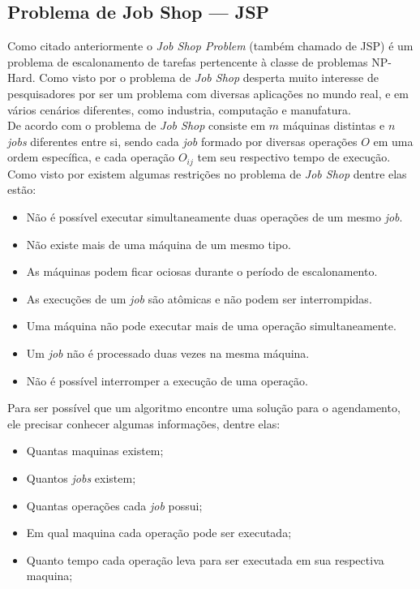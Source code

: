 \subsection{Problema de Job Shop — JSP}
Como citado anteriormente o \textit{Job Shop Problem} (também chamado de JSP) é um problema de escalonamento de tarefas pertencente à classe de problemas NP-Hard. Como visto por \cite{Cheng1996} o problema de \textit{Job Shop} desperta muito interesse de pesquisadores por ser um problema com diversas aplicações no mundo real, e em vários cenários diferentes, como industria, computação e manufatura.\\
\indent De acordo com \cite{Cheng1996} o problema de \textit{Job Shop} consiste em $m$ máquinas distintas e $n$ \textit{jobs} diferentes entre si, sendo cada \textit{job} formado por diversas operações $O$ em uma ordem específica, e cada operação $O_{ij}$ tem seu respectivo tempo de execução.\\
\noindent Como visto por \cite{Bagchi1999} existem algumas restrições no problema de \textit{Job Shop} dentre elas estão:
\begin{itemize}
    \item Não é possível executar simultaneamente duas operações de um mesmo \textit{job}.
    \item Não existe mais de uma máquina de um mesmo tipo.
    \item As máquinas podem ficar ociosas durante o período de escalonamento.
    \item As execuções de um \textit{job} são atômicas e não podem ser interrompidas.
    \item Uma máquina não pode executar mais de uma operação simultaneamente.
    \item Um \textit{job} não é processado duas vezes na mesma máquina.
    \item Não é possível interromper a execução de uma operação.
\end{itemize}

\noindent Para ser possível que um algoritmo encontre uma solução para o agendamento, ele precisar conhecer algumas informações, dentre elas: 
\begin{itemize}
    \item Quantas maquinas existem;
    \item Quantos \textit{jobs} existem;
    \item Quantas operações cada \textit{job} possui;
    \item Em qual maquina cada operação pode ser executada;
    \item Quanto tempo cada operação leva para ser executada em sua respectiva maquina;
\end{itemize}


